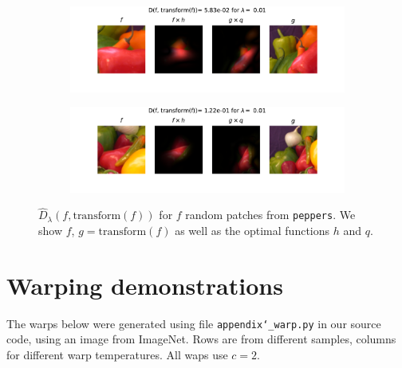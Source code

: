 \begin{figure}[!h]
\begin{subfigure}{0.60\textwidth}
    \end{subfigure}
    \begin{subfigure}{0.60\textwidth}
    \includegraphics[width=\textwidth]{ch1-diffy/figures/fig_peppers/appendix_match_0.01_15.pdf}
    \end{subfigure}
    \begin{subfigure}{0.60\textwidth}
    \includegraphics[width=\textwidth]{ch1-diffy/figures/fig_peppers/appendix_match_0.01_5.pdf}
    \end{subfigure}
    \caption{$\widehat D_\lambda(f, \textrm{transform}(f))$ for $f$ random patches from \texttt{peppers}. We show $f$, $g=\textrm{transform}(f)$ as well as the optimal functions $h$ and $q$.}
    \label{fig:appendix-peppers-matching}
\end{figure}


\section{Warping demonstrations}\label{sec:appendix-warping}
The warps below were generated using file \texttt{appendix\char`_warp.py} in our source code, using an image from ImageNet. Rows are from different samples, columns for different warp temperatures. All waps use $c=2$.

